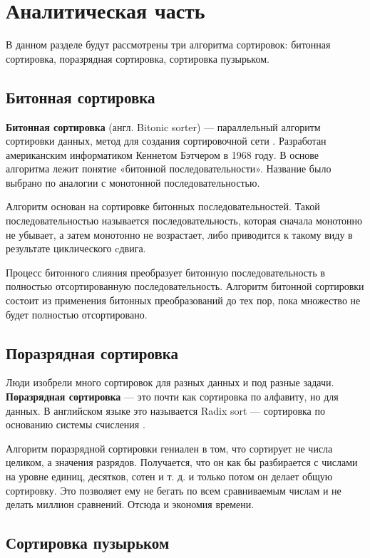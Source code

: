 \chapter{Аналитическая часть}

В данном разделе будут рассмотрены три алгоритма сортировок: битонная сортировка, поразрядная сортировка, сортировка пузырьком.

\section{Битонная сортировка}

\textbf{Битонная сортировка} (англ. Bitonic sorter) --- параллельный алгоритм сортировки данных, метод для создания сортировочной сети \cite{sort1}.
Разработан американским информатиком Кеннетом Бэтчером в 1968 году.
В основе алгоритма лежит понятие «битонной последовательности».
Название было выбрано по аналогии с монотонной последовательностью.

Алгоритм основан на сортировке битонных последовательностей.
Такой последовательностью называется последовательность, которая сначала монотонно не убывает, а затем монотонно не возрастает, либо приводится к такому виду в результате циклического cдвига.

Процесс битонного слияния преобразует битонную последовательность в полностью отсортированную последовательность. Алгоритм битонной сортировки состоит из применения битонных преобразований до тех пор, пока множество не будет полностью отсортировано.

\section{Поразрядная сортировка}

Люди изобрели много сортировок для разных данных и под разные задачи.
\textbf{Поразрядная сортировка} — это почти как сортировка по алфавиту, но для данных. В английском языке это называется Radix sort — сортировка по основанию системы счисления \cite{sort2}.

Алгоритм поразрядной сортировки гениален в том, что сортирует не числа целиком, а значения разрядов.
Получается, что он как бы разбирается с числами на уровне единиц, десятков, сотен и т. д. и только потом он делает общую сортировку.
Это позволяет ему не бегать по всем сравниваемым числам и не делать миллион сравнений.
Отсюда и экономия времени.

\section{Сортировка пузырьком}

